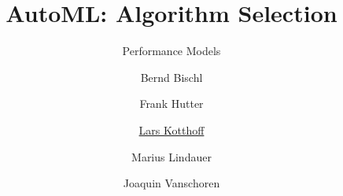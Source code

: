 



\title[AutoML: Overview]{AutoML: Algorithm Selection} %
\subtitle{Performance Models} %
\author[Lars Kotthoff]{Bernd Bischl \and Frank Hutter \and \underline{Lars Kotthoff}\newline \and Marius Lindauer \and Joaquin Vanschoren}
\institute{}
\date{}



	
	\maketitle
	
